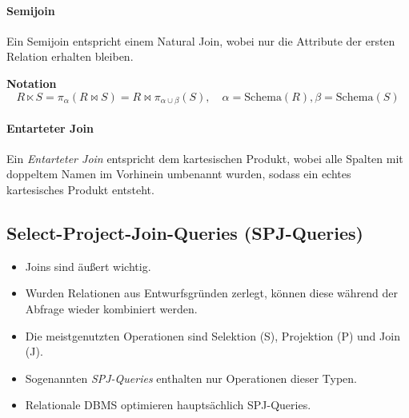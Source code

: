 \documentclass[a4paper, 11pt, accentcolor = tud3b]{tudreport}
\newcommand{\Schema}{\text{Schema}}
\begin{document}
                    \paragraph{Semijoin} %
                        Ein Semijoin entspricht einem Natural Join, wobei nur die Attribute der ersten Relation erhalten bleiben.
                        
                        \textbf{Notation}
                        \begin{equation*}
                        	R \ltimes S = \pi_\alpha(R \bowtie S) = R \bowtie \pi_{\alpha \cup \beta} (S), \quad \alpha = \Schema(R), \beta = \Schema(S)
                        \end{equation*}

                    \paragraph{Entarteter Join} %
                        Ein \textit{Entarteter Join} entspricht dem kartesischen Produkt, wobei alle Spalten mit doppeltem Namen im Vorhinein umbenannt wurden, sodass ein echtes kartesisches Produkt entsteht.

            \subsection{Select-Project-Join-Queries (SPJ-Queries)} %
                \begin{itemize}
                	\item Joins sind äußert wichtig.
                	\item Wurden Relationen aus Entwurfsgründen zerlegt, können diese während der Abfrage wieder kombiniert werden.
                	\item Die meistgenutzten Operationen sind Selektion (S), Projektion (P) und Join (J).
                	\item Sogenannten \textit{SPJ-Queries} enthalten nur Operationen dieser Typen.
                	\item Relationale DBMS optimieren hauptsächlich SPJ-Queries.
                \end{itemize}
\end{document}
